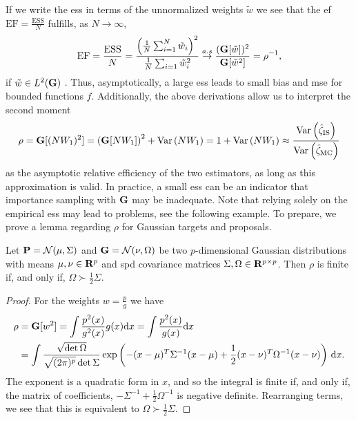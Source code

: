 If we write the \acrshort{ess} in terms of the unnormalized weights $\tilde w$ we see that the \gls{ef} $\text{EF} = \frac{\text{ESS}}{N}$ fulfills, as $N\to\infty$,
$$
\text{EF} = \frac{\text{ESS}}{N} = \frac{\left(\frac{1}{N}\sum_{i = 1}^{N} \tilde w_{i}\right)^{2}}{\frac{1}{N}\sum_{i = 1} \tilde w_{i}^2} \stackrel{a.s}{\to} \frac{(\G [\tilde w])^{2}}{\G [\tilde w^{2}]} = \rho^{-1},
$$
if $\tilde w \in L^{2}(\G)$ \citep[Section 2.3.2]{Agapiou2017Importance}. Thus, asymptotically, a large \acrshort{ess} leads to small bias and \acrshort{mse} for bounded functions $f$. Additionally, the above derivations allow us to interpret the second moment
$$
\rho = \G [(NW_1)^2] = \left(\G [NW_1]\right)^{2} + \var \left( NW_1 \right) = 1 + \var \left(NW_1\right) \approx \frac{\var \left(\hat\zeta_{\text{IS}}\right)}{\var \left(\hat\zeta_{\text{MC}}\right)}
$$
as the asymptotic relative efficiency of the two estimators, as long as this approximation is valid. In practice, a small \acrshort{ess} can be an indicator that importance sampling with $\G$ may be inadequate. Note that relying solely on the empirical \acrshort{ess} may lead to problems, see the following example. To prepare, we prove a lemma regarding $\rho$ for Gaussian targets and proposals.

\begin{lemma}
    \label{lem:gaussian_proposal_factor_2}
    Let $\P = \mathcal N(\mu, \Sigma)$ and $\G = \mathcal N(\nu, \Omega)$ be two $p$-dimensional Gaussian distributions with means $\mu,\nu \in \R^{p}$ and \acrshort{spd} covariance matrices $\Sigma,\Omega \in \R^{p\times p}$. 
    Then $\rho$ is finite if, and only if, $\Omega \succ \frac{1}{2} \Sigma$. 
\end{lemma}

\begin{proof}
    For the weights $w = \frac{p}{g}$ we have
    \begin{align*}
        \rho &= \G [w^{2}] = \int \frac{p^{2}(x)}{g^{2}(x)} g(x) \mathrm d x = \int \frac{p^{2}(x)}{g(x)} \mathrm d x \\
        &= \int \frac{\sqrt{\det \Omega}}{\sqrt{(2\pi)^{p}}\det \Sigma} \exp \left( -(x - \mu)^{T}\Sigma^{-1}(x - \mu) + \frac{1}{2}(x - \nu)^{T}\Omega^{-1}(x - \nu)\right) \d x. 
    \end{align*}
    The exponent is a quadratic form in $x$, and so the integral is finite if, and only if, the matrix of coefficients, $-\Sigma^{-1} + \frac{1}{2}\Omega^{-1}$ is negative definite. Rearranging terms, we see that this is equivalent to $\Omega \succ \frac{1}{2}\Sigma$.
\end{proof}

